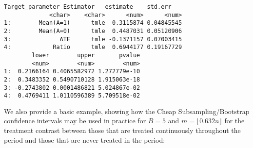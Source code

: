 \documentclass[11pt]{article}
\begin{document}
\begin{verbatim}
Target_parameter Estimator   estimate    std.err
             <char>    <char>      <num>      <num>
1:        Mean(A=1)      tmle  0.3115874 0.04845545
2:        Mean(A=0)      tmle  0.4487031 0.05120906
3:              ATE      tmle -0.1371157 0.07003415
4:            Ratio      tmle  0.6944177 0.19167729
        lower        upper       pvalue
        <num>        <num>        <num>
1:  0.2166164 0.4065582972 1.272779e-10
2:  0.3483352 0.5490710128 1.915063e-18
3: -0.2743802 0.0001486821 5.024867e-02
4:  0.4769411 1.0110596389 5.709518e-02
\end{verbatim}

We also provide a basic example, showing how the
Cheap Subsampling/Bootstrap confidence intervals
may be used in practice for \(B=5\) and \(m=\lfloor 0.632 n \rfloor\)
for the treatment contrast between those that are treated continuously
throughout the period and those that are never treated in the period:
\end{document}
